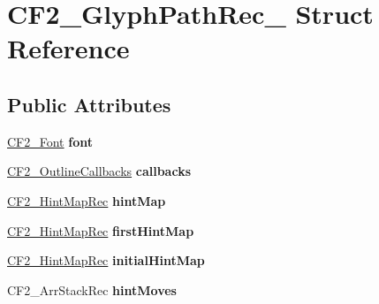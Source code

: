 \hypertarget{struct_c_f2___glyph_path_rec__}{}\section{C\+F2\+\_\+\+Glyph\+Path\+Rec\+\_\+ Struct Reference}
\label{struct_c_f2___glyph_path_rec__}
\subsection*{Public Attributes}
\begin{DoxyCompactItemize}
\item 
\mbox{\label{struct_c_f2___glyph_path_rec___a0dcf9d414ad0809f475bc6c28b86154c}} 
\hyperlink{struct_c_f2___font_rec__}{C\+F2\+\_\+\+Font} {\bfseries font}
\item 
\mbox{\label{struct_c_f2___glyph_path_rec___a27804e40a333084840cd789262a83a82}} 
\hyperlink{struct_c_f2___outline_callbacks_rec__}{C\+F2\+\_\+\+Outline\+Callbacks} {\bfseries callbacks}
\item 
\mbox{\label{struct_c_f2___glyph_path_rec___a2c9a8a7ff1bc5e342fea30a560b148a9}} 
\hyperlink{struct_c_f2___hint_map_rec__}{C\+F2\+\_\+\+Hint\+Map\+Rec} {\bfseries hint\+Map}
\item 
\mbox{\label{struct_c_f2___glyph_path_rec___a2363d4640599cd126bc14f7d4deb301e}} 
\hyperlink{struct_c_f2___hint_map_rec__}{C\+F2\+\_\+\+Hint\+Map\+Rec} {\bfseries first\+Hint\+Map}
\item 
\mbox{\label{struct_c_f2___glyph_path_rec___a6e225992a075e478bfc31c018270d03f}} 
\hyperlink{struct_c_f2___hint_map_rec__}{C\+F2\+\_\+\+Hint\+Map\+Rec} {\bfseries initial\+Hint\+Map}
\item 
\mbox{\label{struct_c_f2___glyph_path_rec___a10b3d1d6e5817f77590b42e75f58dfde}} 
C\+F2\+\_\+\+Arr\+Stack\+Rec {\bfseries hint\+Moves}
\item 
\mbox{\label{struct_c_f2___glyph_path_rec___a6dca16509862d89f0c204263048c72b7}} 

\end{DoxyCompactItemize}
